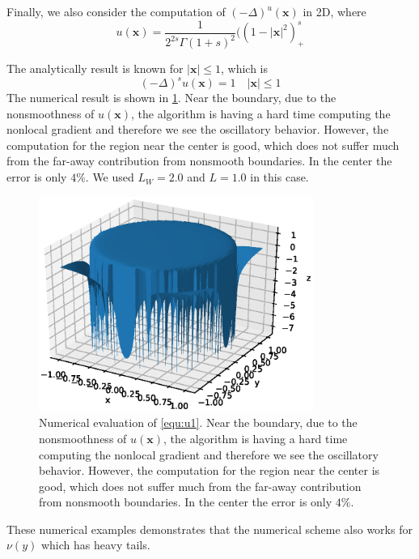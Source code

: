 \documentclass[10pt,a4paper]{article}
\newcommand{\bx}[0]{\mathbf{x}}
\theoremstyle{definition}
\begin{document}
Finally, we also consider the computation of $(-\Delta)^ u(\bx)$ in 2D, where
\begin{equation}
	u(\bx) = \frac{1}{2^{2s}\Gamma(1+s)^2} ((1-|\bx|^2)^s_+
\end{equation}

The analytically result is known for $|\bx|\leq 1$, which is
\begin{equation}\label{equ:u1}
	(-\Delta)^s u(\bx) = 1\quad |\bx|\leq 1
\end{equation}
The numerical result is shown in \cref{fig:fig8}. Near the boundary, due to the nonsmoothness of $u(\bx)$, the algorithm is having a hard time computing the nonlocal gradient and therefore we see the oscillatory behavior. However, the computation for the region near the center is  good, which does not suffer much from the far-away contribution from nonsmooth boundaries. In the center the error is only $4\%$. We used $L_W=2.0$ and $L=1.0$ in this case.  

\begin{figure}[H] %
\centering
\includegraphics[width=0.8\textwidth,keepaspectratio]{figures/fig8}
\caption{Numerical evaluation of \cref{equ:u1}. Near the boundary, due to the nonsmoothness of $u(\bx)$, the algorithm is having a hard time computing the nonlocal gradient and therefore we see the oscillatory behavior. However, the computation for the region near the center is  good, which does not suffer much from the far-away contribution from nonsmooth boundaries. In the center the error is only $4\%$.}
\label{fig:fig8}
\end{figure}

These numerical examples demonstrates that the numerical scheme also works for $\nu(y)$ which has heavy tails. 
\end{document}

